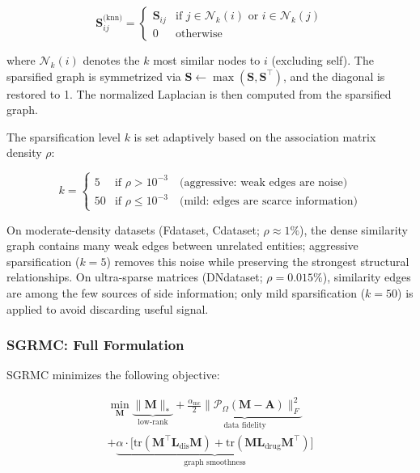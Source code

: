 \documentclass[webpdf,modern,large]{oup-authoring-template}
\newcommand{\tr}{\mathrm{tr}}
\begin{document}
\begin{equation}
\mathbf{S}_{ij}^{\text{(knn)}} =
\begin{cases}
\mathbf{S}_{ij} & \text{if } j \in \mathcal{N}_k(i) \text{ or } i \in \mathcal{N}_k(j) \\
0 & \text{otherwise}
\end{cases}
\label{eq:knn}
\end{equation}

where $\mathcal{N}_k(i)$ denotes the $k$ most similar nodes to $i$ (excluding self). The sparsified graph is symmetrized via $\mathbf{S} \gets \max(\mathbf{S}, \mathbf{S}^\top)$, and the diagonal is restored to 1. The normalized Laplacian is then computed from the sparsified graph.

The sparsification level $k$ is set adaptively based on the association matrix density $\rho$:

\begin{equation}
k = \begin{cases}
5  & \text{if } \rho > 10^{-3} \quad \text{(aggressive: weak edges are noise)} \\
50 & \text{if } \rho \le 10^{-3} \quad \text{(mild: edges are scarce information)}
\end{cases}
\label{eq:k_adaptive}
\end{equation}

On moderate-density datasets (Fdataset, Cdataset; $\rho \approx 1\%$), the dense similarity graph contains many weak edges between unrelated entities; aggressive sparsification ($k=5$) removes this noise while preserving the strongest structural relationships. On ultra-sparse matrices (DNdataset; $\rho = 0.015\%$), similarity edges are among the few sources of side information; only mild sparsification ($k=50$) is applied to avoid discarding useful signal.

\subsubsection{SGRMC: Full Formulation}

SGRMC minimizes the following objective:

\begin{multline}
\min_{\mathbf{M}}
\underbrace{\|\mathbf{M}\|_*}_{\text{low-rank}}
+ \underbrace{\frac{\alpha_{\text{mc}}}{2}\|\mathcal{P}_\Omega(\mathbf{M} - \mathbf{A})\|_F^2}_{\text{data fidelity}} \\
+ \underbrace{\alpha \cdot \big[\tr(\mathbf{M}^\top \mathbf{L}_{\text{dis}} \mathbf{M})
+ \tr(\mathbf{M} \mathbf{L}_{\text{drug}} \mathbf{M}^\top)\big]}_{\text{graph smoothness}}
\label{eq:sgrmc_obj}
\end{multline}
\end{document}
